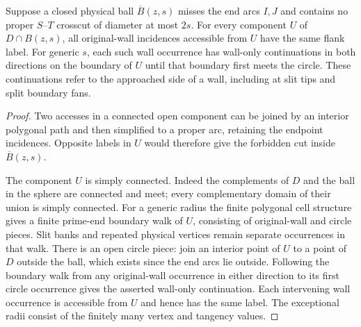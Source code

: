 \begin{lemma}
\label{disk:local-access}
Suppose a closed physical ball $\overline B(z,s)$ misses the end arcs
$I,J$ and contains no proper $S$--$T$ crosscut of diameter at most $2s$.
For every component $U$ of $D\cap B(z,s)$, all original-wall incidences
accessible from $U$ have the same flank label.  For generic $s$, each
such wall occurrence has wall-only continuations in both directions
on the boundary of $U$ until that boundary first meets the circle.
These continuations refer to the approached side of a wall, including
at slit tips and split boundary fans.
\end{lemma}

\begin{proof}
Two accesses in a connected open component can be joined by an
interior polygonal path and then simplified to a proper arc, retaining
the endpoint incidences.  Opposite labels in $U$ would therefore give
the forbidden cut inside $\overline B(z,s)$.

The component $U$ is simply connected.  Indeed the complements of $D$
and the ball in the sphere are connected and meet; every complementary
domain of their union is simply connected.  For a generic radius the
finite polygonal cell structure gives a finite prime-end boundary walk
of $U$, consisting of original-wall and circle pieces.  Slit banks and
repeated physical vertices remain separate occurrences in that walk.
There is an open circle piece: join an interior point of $U$ to a point
of $D$ outside the ball, which exists since the end arcs lie outside.
Following the boundary walk from any original-wall occurrence in either
direction to its first circle occurrence gives the asserted wall-only
continuation.  Each intervening wall occurrence is accessible from $U$
and hence has the same label.  The exceptional radii consist of the
finitely many vertex and tangency values.
\end{proof}


